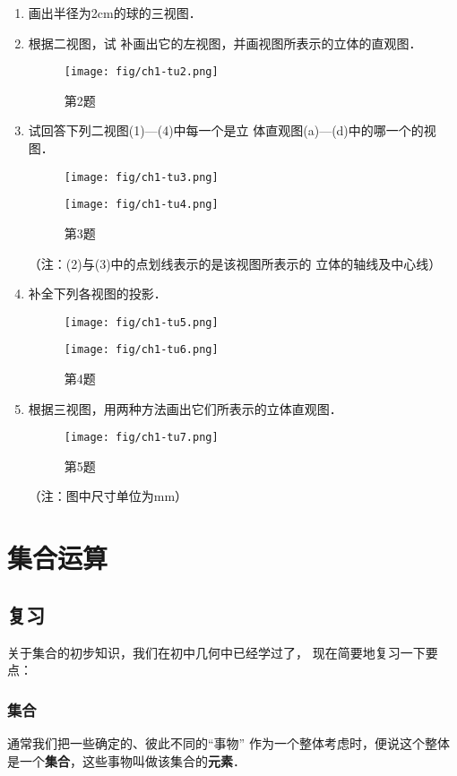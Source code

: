 \begin{enumerate}
    \item 画出半径为2cm的球的三视图．
    \item 根据二视图，试
    补画出它的左视图，并画视图所表示的立体的直观图．
\begin{figure}[htp]
  \centering
\texttt{[image: fig/ch1-tu2.png]}
  \caption*{第2题}
\end{figure}


    \item 试回答下列二视图(1)—(4)中每一个是立
    体直观图(a)—(d)中的哪一个的视图．
    \begin{figure}[htp]
      \centering
    \texttt{[image: fig/ch1-tu3.png]}
    \end{figure}
    \begin{figure}[htp]
      \centering
    \texttt{[image: fig/ch1-tu4.png]}
      \caption*{第3题}
    \end{figure}
    （注：(2)与(3)中的点划线表示的是该视图所表示的
    立体的轴线及中心线）

    \item 补全下列各视图的投影．
    \begin{figure}[htp]
      \centering
    \texttt{[image: fig/ch1-tu5.png]}
    \end{figure}
    \begin{figure}[htp]
      \centering
    \texttt{[image: fig/ch1-tu6.png]}
      \caption*{第4题}
    \end{figure}   


    \item 根据三视图，用两种方法画出它们所表示的立体直观图．
    \begin{figure}[htp]
      \centering
    \texttt{[image: fig/ch1-tu7.png]}
      \caption*{第5题}
    \end{figure}
    （注：图中尺寸单位为mm）
\end{enumerate}



\section{集合运算}
\subsection{复习}
关于集合的初步知识，我们在初中几何中已经学过了，
现在简要地复习一下要点：

\subsubsection{集合}
通常我们把一些确定的、彼此不同的“事物”
作为一个整体考虑时，便说这个整体是一个\textbf{集合}，这些事物叫做该集合的\textbf{元素}．

